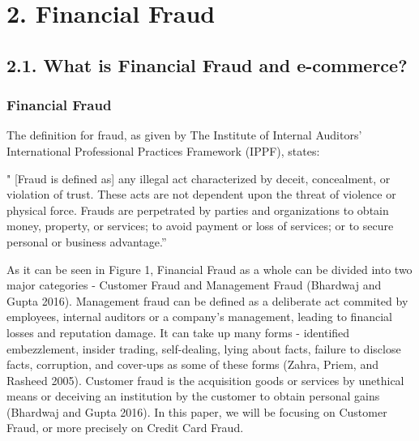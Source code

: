 \documentclass[12pt,]{article}
\begin{document}
\hypertarget{financial-fraud}{%
\section{2. Financial Fraud}\label{financial-fraud}}

\hypertarget{what-is-financial-fraud-and-e-commerce}{%
\subsection{2.1. What is Financial Fraud and
e-commerce?}\label{what-is-financial-fraud-and-e-commerce}}

\hypertarget{financial-fraud-1}{%
\subsubsection{Financial Fraud}\label{financial-fraud-1}}

The definition for fraud, as given by The Institute of Internal
Auditors' International Professional Practices Framework (IPPF), states:

" {[}Fraud is defined as{]} any illegal act characterized by deceit,
concealment, or violation of trust. These acts are not dependent upon
the threat of violence or physical force. Frauds are perpetrated by
parties and organizations to obtain money, property, or services; to
avoid payment or loss of services; or to secure personal or business
advantage.''

As it can be seen in Figure 1, Financial Fraud as a whole can be divided
into two major categories - Customer Fraud and Management Fraud
(Bhardwaj and Gupta 2016). Management fraud can be defined as a
deliberate act commited by employees, internal auditors or a company's
management, leading to financial losses and reputation damage. It can
take up many forms - identified embezzlement, insider trading,
self-dealing, lying about facts, failure to disclose facts, corruption,
and cover-ups as some of these forms (Zahra, Priem, and Rasheed 2005).
Customer fraud is the acquisition goods or services by unethical means
or deceiving an institution by the customer to obtain personal gains
(Bhardwaj and Gupta 2016). In this paper, we will be focusing on
Customer Fraud, or more precisely on Credit Card Fraud.
\end{document}
